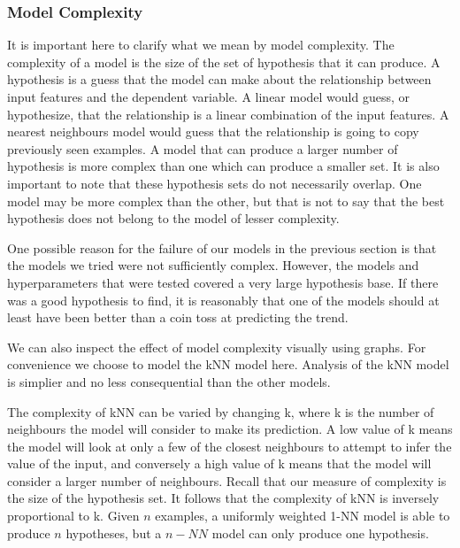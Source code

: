 \documentclass{report}
\begin{document}
\subsubsection{Model Complexity}

It is important here to clarify what we mean by model complexity. The complexity of a model is the size of the set of hypothesis that it can produce. A hypothesis is a guess that the model can make about the relationship between input features and the dependent variable. A linear model would guess, or hypothesize, that the relationship is a linear combination of the input features. A nearest neighbours model would guess that the relationship is going to copy previously seen examples. A model that can produce a larger number of hypothesis is more complex than one which can produce a smaller set. It is also important to note that these hypothesis sets do not necessarily overlap. One model may be more complex than the other, but that is not to say that the best hypothesis does not belong to the model of lesser complexity.

One possible reason for the failure of our models in the previous section is that the models we tried were not sufficiently complex. However, the models and hyperparameters that were tested covered a very large hypothesis base. If there was a good hypothesis to find, it is reasonably that one of the models should at least have been better than a coin toss at predicting the trend. 

We can also inspect the effect of model complexity visually using graphs. For convenience we choose to model the kNN model here. Analysis of the kNN model is simplier and no less consequential than the other models.

The complexity of kNN can be varied by changing k, where k is the number of neighbours the model will consider to make its prediction. A low value of k means the model will look at only a few of the closest neighbours to attempt to infer the value of the input, and conversely a high value of k means that the model will consider a larger number of neighbours. Recall that our measure of complexity is the size of the hypothesis set. It follows that the complexity of kNN is inversely proportional to k. Given $n$ examples, a uniformly weighted 1-NN model is able to produce $n$ hypotheses, but a $n-NN$ model can only produce one hypothesis.
\end{document}
